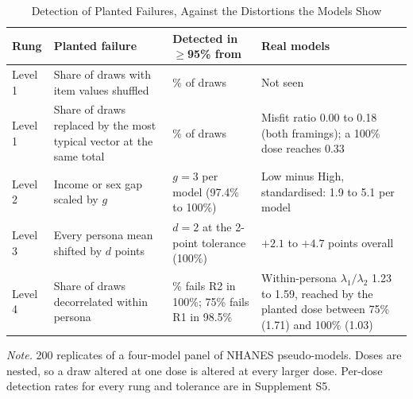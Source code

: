 \begin{table}[tp]
\centering
\caption{Detection of Planted Failures, Against the Distortions the Models Show}
\label{tab:s5dose}
\small
\setlength{\tabcolsep}{4pt}
\begin{tabular}{@{}l>{\raggedright\arraybackslash}p{4.1cm}>{\raggedright\arraybackslash}p{3.9cm}>{\raggedright\arraybackslash}p{4.4cm}@{}}
\toprule
Rung & Planted failure & Detected in $\ge$95\% from & Real models \\
\midrule
Level 1 & Share of draws with item values shuffled & 40\% of draws & Not seen \\
Level 1 & Share of draws replaced by the most typical vector at the same total & 80\% of draws & Misfit ratio 0.00 to 0.18 (both framings); a 100\% dose reaches 0.33 \\
Level 2 & Income or sex gap scaled by $g$ & $g = 3$ per model (97.4\% to 100\%) & Low minus High, standardised: 1.9 to 5.1 per model \\
Level 3 & Every persona mean shifted by $d$ points & $d = 2$ at the 2-point tolerance (100\%) & $+2.1$ to $+4.7$ points overall \\
Level 4 & Share of draws decorrelated within persona & 50\% fails R2 in 100\%; 75\% fails R1 in 98.5\% & Within-persona $\lambda_1/\lambda_2$ 1.23 to 1.59, reached by the planted dose between 75\% (1.71) and 100\% (1.03) \\
\bottomrule
\end{tabular}
\vspace{4pt}
\begin{tabnote}
\textit{Note.} 200 replicates of a four-model panel of NHANES pseudo-models. Doses are nested, so a draw altered at one dose is altered at every larger dose. Per-dose detection rates for every rung and tolerance are in Supplement S5. %
\end{tabnote}
\end{table}
